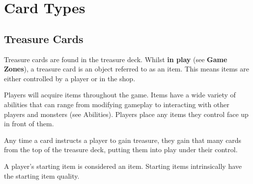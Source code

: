 \documentclass[../main.tex]{subfiles}
\begin{document}
  \chapter{Card Types}
  \section{Treasure Cards}
  Treasure cards are found in the treasure deck. Whilst \textbf{in play} (see \textbf{Game Zones}), a treasure card is an object referred to as an item. This means items are either controlled by a player or in the shop.

  Players will acquire items throughout the game. Items have a wide variety of abilities that can range from modifying gameplay to interacting with other players and monsters (see Abilities). Players place any items they control face up in front of them.

  Any time a card instructs a player to gain treasure, they gain that many cards from the top of the treasure deck, putting them into play under their control.

  A player’s starting item is considered an item. Starting items intrinsically have the starting item quality.
\end{document}
